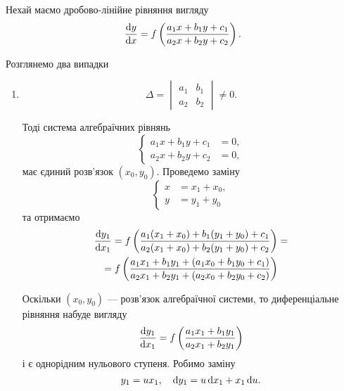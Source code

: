 Нехай маємо дробово-лінійне рівняння вигляду
\begin{equation*}
	\frac{\mathop{}\!\mathrm{d} y}{\mathop{}\!\mathrm{d} x} = f \left( \frac{a_1 x + b_1 y + c_1}{a_2 x + b_2 y + c_2} \right).
\end{equation*}

Розглянемо два випадки
\begin{enumerate}
	\item 
	\begin{equation*}
		\Delta = 
		\begin{vmatrix} 
			a_1 & b_1 \\ 
			a_2 & b_2 
		\end{vmatrix} 
		\ne 0.
	\end{equation*}

	Тоді система алгебраїчних рівнянь
	\begin{equation*}
		\left\{
			\begin{aligned}
				a_1 x + b_1 y + c_1 &= 0, \\
				a_2 x + b_2 y + c_2 &= 0,
			\end{aligned}
		\right.
	\end{equation*}
	має єдиний розв’язок $(x_0, y_0)$. Проведемо заміну 
	\begin{equation*}
		\left\{
			\begin{aligned}
			x &= x_1 + x_0, \\
			y &= y_1 + y_0
			\end{aligned}
		\right.
	\end{equation*}
	та отримаємо
	\begin{multline*}
		\frac{\mathop{}\!\mathrm{d} y_1}{\mathop{}\!\mathrm{d} x_1} = f \left( \frac{a_1 (x_1 + x_0) + b_1 (y_1 + y_0) + c_1}{a_2 (x_1 + x_0) + b_2 (y_1 + y_0) + c_2} \right) = \\
		= f \left( \frac{a_1 x_1 + b_1 y_1 + (a_1 x_0 + b_1 y_0 + c_1)}{a_2 x_1 + b_2 y_1 + (a_2 x_0 + b_2 y_0 + c_2)} \right)
	\end{multline*}

	Оскільки $(x_0, y_0)$ --- розв’язок алгебраїчної системи, то диференціальне рівняння набуде вигляду
	\begin{equation*}
		\frac{\mathop{}\!\mathrm{d} y_1}{\mathop{}\!\mathrm{d} x_1} = f \left( \frac{a_1 x_1 + b_1 y_1}{a_2 x_1 + b_2 y_1} \right)
	\end{equation*}
	і є однорідним нульового ступеня. Робимо заміну 
	\begin{equation*}
		y_1 = u x_1, \quad \mathop{}\!\mathrm{d} y_1 = u \mathop{}\!\mathrm{d} x_1 + x_1 \mathop{}\!\mathrm{d} u.
	\end{equation*}


\end{enumerate}
